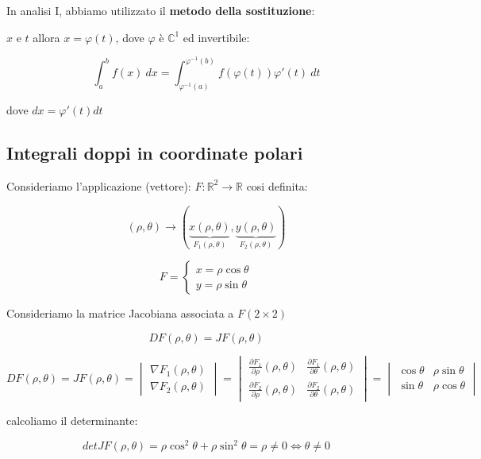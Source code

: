 \documentclass[../appunti-analisi.tex]{subfiles}
\begin{document}
In analisi I, abbiamo utilizzato il \textbf{metodo della sostituzione}:

$x$ e $t$ allora $x=\varphi(t)$, dove $\varphi$ è $\mathbb{C}^{1}$ ed invertibile:

\[
    \int_{a}^{b} {f(x)} \: dx = \int_{\varphi^{-1}(a)}^{\varphi^{-1}(b)} {f(\varphi(t))\varphi'(t)} \: dt 
\]

dove $d x = \varphi'(t) dt$


\subsection{Integrali doppi in coordinate polari}

Consideriamo l'applicazione (vettore): $F: \mathbb{R}^{2} \rightarrow \mathbb{R}$ cosi definita:

\[
    (\rho, \theta) \rightarrow (\underbrace{x(\rho, \theta)}_\text{$F_1(\rho, \theta)$}, \underbrace{y(\rho, \theta)}_\text{$F_2(\rho,\theta)$})
\]

\[
    F = \begin{cases}
        x=\rho \cos \theta\\
         y = \rho \sin \theta
    \end{cases}
\]


Consideriamo la matrice Jacobiana associata a $F(2\times 2 )$

\[
    DF(\rho,\theta) = JF(\rho,\theta)
\]

\[
    DF(\rho,\theta) = JF(\rho,\theta) = \begin{vmatrix}
    \nabla F_1(\rho,\theta)\\
     \nabla F_2(\rho,\theta)
    \end{vmatrix} = \begin{vmatrix}
    \frac{\partial F_1}{\partial \rho}(\rho,\theta) & \frac{\partial F_1}{\partial \theta}(\rho,\theta)\\
    \frac{\partial F_2}{\partial \rho}(\rho,\theta) & \frac{\partial F_2}{\partial \theta}(\rho,\theta)
    \end{vmatrix} = \begin{vmatrix}
    \cos \theta & \rho \sin \theta\\
    \sin \theta & \rho \cos \theta 
    \end{vmatrix}
\]

calcoliamo il determinante:

\[
    det JF(\rho,\theta) = \rho \cos^{2}\theta+ \rho \sin^{2}\theta = \rho \neq 0 \Leftrightarrow \theta \neq 0
\]
\end{document}

